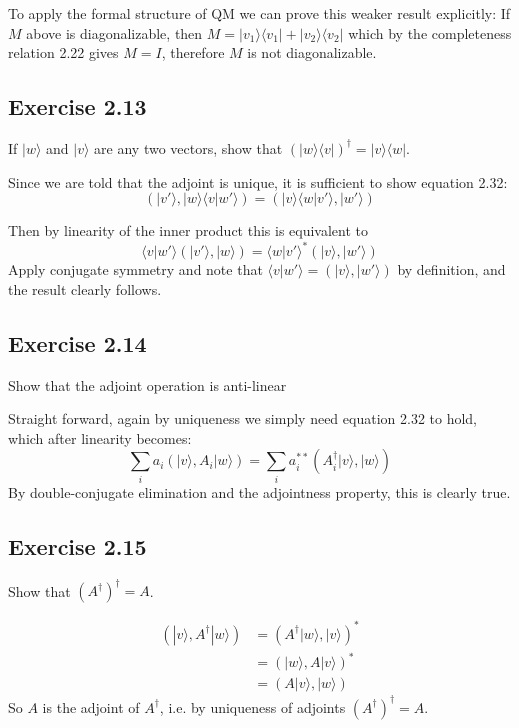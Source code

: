 \documentclass[]{article}
\begin{document}
To apply the formal structure of QM we can prove this weaker result explicitly: If $M$ above is diagonalizable, then $M = |v_1\rangle\langle v_1| + |v_2\rangle\langle v_2|$ which by the completeness relation 2.22 gives $M = I$, therefore $M$ is not diagonalizable.

\subsection{Exercise 2.13}

If $|w\rangle$ and $|v\rangle$ are any two vectors, show that $(|w\rangle\langle v|)^\dagger = |v\rangle\langle w|$.

Since we are told that the adjoint is unique, it is sufficient to show equation 2.32:
\[(|v'\rangle, |w\rangle\langle v|w'\rangle) = (|v\rangle\langle w|v'\rangle, |w'\rangle)\]

Then by linearity of the inner product this is equivalent to
\[\langle v|w'\rangle(|v'\rangle, |w\rangle) = \langle w|v'\rangle^*(|v\rangle, |w'\rangle)\]
Apply conjugate symmetry and note that $\langle v|w'\rangle = (|v\rangle, |w'\rangle)$ by definition, and the result clearly follows.

\subsection{Exercise 2.14}

Show that the adjoint operation is anti-linear

Straight forward, again by uniqueness we simply need equation 2.32 to hold, which after linearity becomes:
\[\sum_i a_i(|v\rangle, A_i|w\rangle) = \sum_i a_i^{**}(A_i^\dagger|v\rangle, |w\rangle)\]
By double-conjugate elimination and the adjointness property, this is clearly true.

\subsection{Exercise 2.15}

Show that $(A^\dagger)^\dagger = A$.

\begin{align*}
(|v\rangle, A^\dagger|w\rangle)
&= (A^\dagger|w\rangle, |v\rangle)^* \\
&= (|w\rangle, A|v\rangle)^* \\
&= (A|v\rangle, |w\rangle)
\end{align*}
So $A$ is the adjoint of $A^\dagger$, i.e. by uniqueness of adjoints $(A^\dagger)^\dagger = A$.
\end{document}

